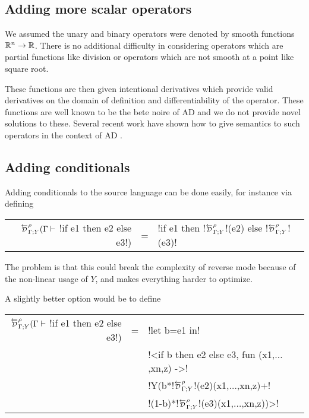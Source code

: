 \subsection{Adding more scalar operators} %
\label{sub:Adding more scalar operators}

We assumed the unary and binary operators were denoted by smooth functions $\mathbb{R}^n\to\mathbb{R}$. 
There is no additional difficulty in considering operators which are partial functions 
like division or operators which are not smooth at a point like square root.

These functions are then given intentional derivatives which provide valid derivatives 
on the domain of definition and differentiability of the operator. 
These functions are well known to be the bete noire of AD \cite{griewank2008evaluating} 
and we do not provide novel solutions to these.  
Several recent work have shown how to give semantics to such operators in the context of AD \cite{vakar2020denotational,mazza2021automatic,sherman2021,lee2020correctness}.

\subsection{Adding conditionals} %
\label{sub:Adding conditionals}

Adding conditionals to the source language can be done easily, for instance via defining

\begin{tabular}{r c l}
$\directD{\rho}{\Gamma}{Y}(\Gamma \vdash$ !if e1 then e2 else e3!) &=& !if e1 then !$\directD{\rho}{\Gamma}{Y}$!(e2) else !$\directD{\rho}{\Gamma}{Y}$!(e3)! 
\end{tabular}

The problem is that this could break the complexity of reverse mode because of the non-linear usage of $Y$, and makes everything harder to optimize.

A slightly better option would be to define 

\begin{tabular}{r c l}
    $\directD{\rho}{\Gamma}{Y}(\Gamma \vdash$ !if e1 then e2 else e3!) 
    &=& !let b=e1 in!   \\
    && !<if b then e2 else e3, fun (x1,$\ldots$,xn,z) ->! \\
    && !Y(b*!$\directD{\rho}{\Gamma}{Y}$!(e2)(x1,$\ldots$,xn,z)+!\\
    && \quad!(1-b)*!$\directD{\rho}{\Gamma}{Y}$!(e3)(x1,$\ldots$,xn,z))>!
\end{tabular}

